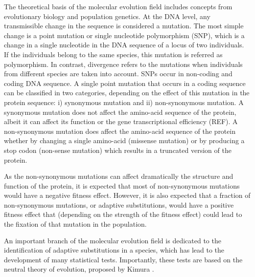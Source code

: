 The theoretical basis of the molecular evolution field includes concepts from evolutionary biology and population genetics. At the DNA level, any transmissible change in the sequence is considered a mutation. 
The most simple change is a point mutation or single nucleotide polymorphism (SNP),
which is a change in a single nucleotide in the DNA sequence of a locus of two individuals. 
If the individuals belong to the same species, this mutation is referred as polymorphism. In contrast, divergence refers to the mutations when individuals from different species are taken into account. 
SNPs occur in non-coding and coding DNA sequence. A single point mutation that occurs in a coding sequence can be classified in two categories, depending on the effect of this mutation in the protein sequence: i) synonymous mutation and ii) non-synonymous mutation.
A synonymous mutation does not affect the amino-acid sequence of the protein, albeit it can affect its function 
	\citep{Kimchi-Sarfaty2007}
or the gene transcriptional efficiency (REF).
A non-synonymous mutation does affect the amino-acid sequence of the protein whether by changing a single amino-acid (missense mutation) or by producing a stop codon (non-sense mutation) which results in a truncated version of the protein.

As the non-synonymous mutations can affect dramatically the structure and function of the protein, it is expected that most of non-synonymous mutations would have a negative fitness effect.
However, it is also expected that a fraction of non-synonymous mutations, or adaptive substitutions, would have a positive fitness effect that (depending on the strength of the fitness effect) could lead to the fixation of that mutation in the population.

An important branch of the molecular evolution field is dedicated to the identification of adaptive substitutions in a species, which has lead to the development of many statistical tests. 
Importantly, these tests are based on the neutral theory of evolution, proposed by Kimura
	\citep{Kimura1968}.

